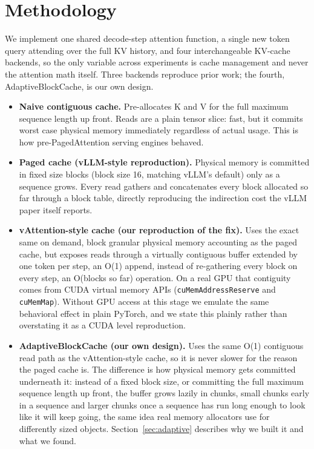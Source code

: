 \documentclass[lettersize,journal]{IEEEtran}
\begin{document}
\section{Methodology}

We implement one shared decode-step attention function, a single new token query attending over the full KV history, and four interchangeable KV-cache backends, so the only variable across experiments is cache management and never the attention math itself. Three backends reproduce prior work; the fourth, AdaptiveBlockCache, is our own design.

\begin{itemize}
    \item \textbf{Naive contiguous cache.} Pre-allocates K and V for the full maximum sequence length up front. Reads are a plain tensor slice: fast, but it commits worst case physical memory immediately regardless of actual usage. This is how pre-PagedAttention serving engines behaved.
    \item \textbf{Paged cache (vLLM-style reproduction).} Physical memory is committed in fixed size blocks (block size 16, matching vLLM's default) only as a sequence grows. Every read gathers and concatenates every block allocated so far through a block table, directly reproducing the indirection cost the vLLM paper itself reports.
    \item \textbf{vAttention-style cache (our reproduction of the fix).} Uses the exact same on demand, block granular physical memory accounting as the paged cache, but exposes reads through a virtually contiguous buffer extended by one token per step, an O(1) append, instead of re-gathering every block on every step, an O(blocks so far) operation. On a real GPU that contiguity comes from CUDA virtual memory APIs (\texttt{cuMemAddressReserve} and \texttt{cuMemMap}). Without GPU access at this stage we emulate the same behavioral effect in plain PyTorch, and we state this plainly rather than overstating it as a CUDA level reproduction.
    \item \textbf{AdaptiveBlockCache (our own design).} Uses the same O(1) contiguous read path as the vAttention-style cache, so it is never slower for the reason the paged cache is. The difference is how physical memory gets committed underneath it: instead of a fixed block size, or committing the full maximum sequence length up front, the buffer grows lazily in chunks, small chunks early in a sequence and larger chunks once a sequence has run long enough to look like it will keep going, the same idea real memory allocators use for differently sized objects. Section~\ref{sec:adaptive} describes why we built it and what we found.
\end{itemize}
\end{document}

